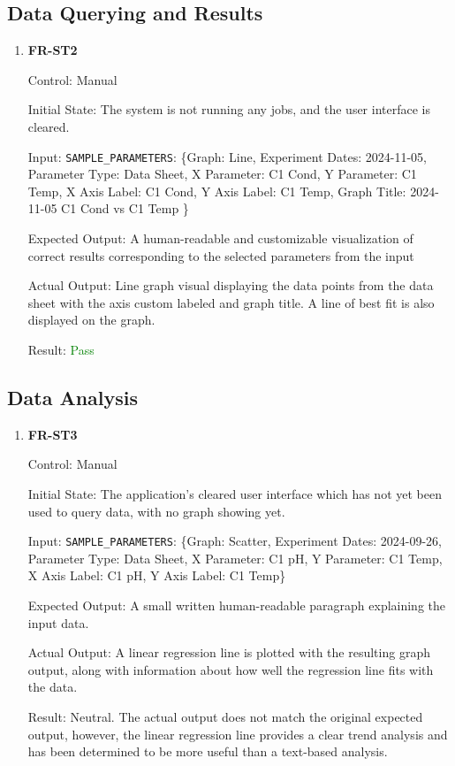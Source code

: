 \documentclass[12pt, titlepage]{article}
\begin{document}
\subsection{Data Querying and Results}
\begin{enumerate}
\item{\textbf{FR-ST2}} \label{FR:ST2}

Control: Manual

Initial State: The system is not running any jobs, and the user interface is
cleared.

Input: \texttt{SAMPLE\_PARAMETERS}: \{Graph: Line, Experiment Dates: 2024-11-05,
Parameter Type: Data Sheet, X Parameter: C1 Cond, Y Parameter: C1 Temp, X Axis
Label: C1 Cond, Y Axis Label: C1 Temp, Graph Title: 2024-11-05 C1 Cond vs C1
Temp \}

Expected Output: A human-readable and customizable visualization of correct
results corresponding to the selected parameters from the input

Actual Output: Line graph visual displaying the data points from the data sheet
with the axis custom labeled and graph title. A line of best fit is also
displayed on the graph.

Result: \textcolor{green}{Pass}
\end{enumerate}

\subsection{Data Analysis}
\begin{enumerate}
\item{\textbf{FR-ST3}} \label{FR:ST3}

Control: Manual

Initial State: The application's cleared user interface which has not yet been
used to query data, with no graph showing yet.

Input: \texttt{SAMPLE\_PARAMETERS}: \{Graph: Scatter, Experiment Dates: 2024-09-26,
Parameter Type: Data Sheet, X Parameter: C1 pH, Y Parameter: C1 Temp, X Axis
Label: C1 pH, Y Axis Label: C1 Temp\}

Expected Output: A small written human-readable paragraph explaining the input
data.

Actual Output: A linear regression line is plotted with the resulting graph
output, along with information about how well the regression line fits with the
data.

Result: Neutral. The actual output does not match the original expected output,
however, the linear regression line provides a clear trend analysis and has been
determined to be more useful than a text-based analysis.
\end{enumerate}
\end{document}
